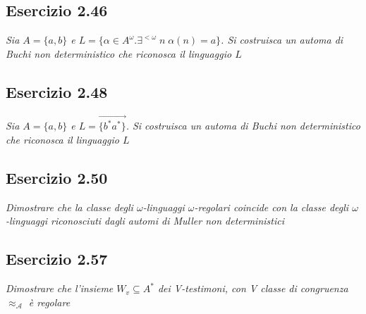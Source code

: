 \documentclass[12pt]{article}
\begin{document}
\subsection*{Esercizio 2.46}
\textit{Sia $A=\{a,b\}$ e $L=\{\alpha \in A^\omega. \exists^{<\omega}\;n\;\alpha(n)=a\}$. Si costruisca un automa di Buchi non deterministico che riconosca il linguaggio $L$}
 
\begin{center}
\end{center}


\subsection*{Esercizio 2.48}
\textit{Sia $A=\{a,b\}$ e $L=\overrightarrow{\{b^*a^*\}}$. Si costruisca un automa di Buchi non deterministico che riconosca il linguaggio $L$}

\begin{center}
\end{center}


\subsection*{Esercizio 2.50}
\textit{Dimostrare che la classe degli $\omega$-linguaggi $\omega$-regolari coincide con la classe degli $\omega$-linguaggi riconosciuti dagli automi di Muller non deterministici}


\subsection*{Esercizio 2.57}
\textit{Dimostrare che l'insieme $W_v\subseteq A^*$ dei V-testimoni, con V classe di congruenza $\approx_\mathcal{A}$ è regolare}
\end{document}
